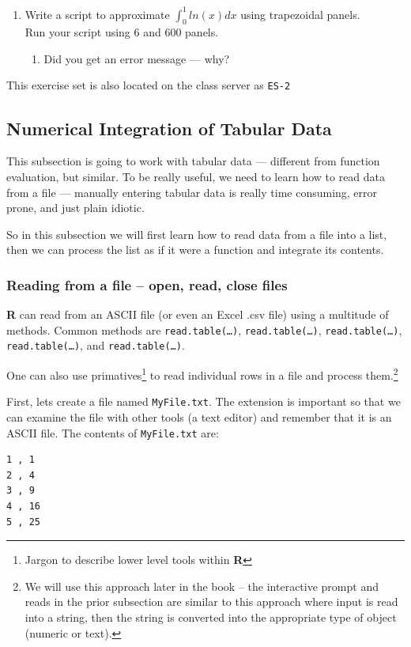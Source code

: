 \begin{enumerate}
\item Write a script to approximate $\int_{0}^{1}ln(x) dx$ using trapezoidal panels.  \\Run your script using 6 and 600 panels.  
\begin{enumerate}
\item Did you get an error message --- why?
\end{enumerate}

\end{enumerate}

This exercise set is also located on the class server as \texttt{ES-2}
\clearpage

\subsection{Numerical Integration of Tabular Data}
This subsection is going to work with tabular data --- different from function evaluation, but similar.  
To be really useful, we need to learn how to read data from a file --- manually entering tabular data is really time consuming, error prone, and just plain idiotic.

So in this subsection we will first learn how to read data from a file into a list, then we can process the list as if it were a function and integrate its contents.   %

\subsubsection{Reading from a file -- open, read, close files}
\textbf{R} can read from an ASCII file (or even an Excel .csv file) using a multitude of methods.  Common methods are \texttt{read.table(\dots )}, \texttt{read.table(\dots )}, \texttt{read.table(\dots )}, \texttt{read.table(\dots )}, and \texttt{read.table(\dots )}.

One can also use primatives\footnote{Jargon to describe lower level tools within \textbf{R}} to read individual rows in a file and process them.\footnote{We will use this approach later in the book -- the interactive prompt and reads in the prior subsection are similar to this approach where input is read into a string, then the string is converted into the appropriate type of object (numeric or text).}

First, lets create a file named \texttt{MyFile.txt}.
The extension is important so that we can examine the file with other tools (a text editor) and remember that it is an ASCII file.
The contents of \texttt{MyFile.txt} are:
\begin{verbatim}
1 , 1
2 , 4
3 , 9
4 , 16
5 , 25
\end{verbatim}

